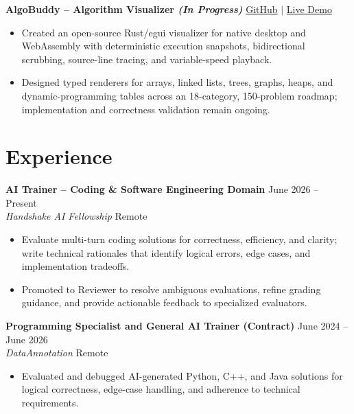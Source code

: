 \documentclass[10pt,letterpaper]{article}
\begin{document}
\vspace{3pt}
\textbf{AlgoBuddy -- Algorithm Visualizer \textit{(In Progress)}}
\hfill
\href{https://github.com/Rowrow620/AlgoBuddy}{GitHub}
$|$
\href{https://rowrow620.github.io/AlgoBuddy}{Live Demo}
\begin{itemize}
    \item Created an open-source Rust/egui visualizer for native desktop and WebAssembly with deterministic execution snapshots, bidirectional scrubbing, source-line tracing, and variable-speed playback.
    \item Designed typed renderers for arrays, linked lists, trees, graphs, heaps, and dynamic-programming tables across an 18-category, 150-problem roadmap; implementation and correctness validation remain ongoing.
\end{itemize}

\section*{Experience}

\textbf{AI Trainer -- Coding \& Software Engineering Domain}
\hfill June 2026 -- Present \\
\textit{Handshake AI Fellowship}
\hfill Remote
\begin{itemize}
    \item Evaluate multi-turn coding solutions for correctness, efficiency, and clarity; write technical rationales that identify logical errors, edge cases, and implementation tradeoffs.
    \item Promoted to Reviewer to resolve ambiguous evaluations, refine grading guidance, and provide actionable feedback to specialized evaluators.
\end{itemize}

\vspace{3pt}
\textbf{Programming Specialist and General AI Trainer (Contract)}
\hfill June 2024 -- June 2026 \\
\textit{DataAnnotation}
\hfill Remote
\begin{itemize}
    \item Evaluated and debugged AI-generated Python, C++, and Java solutions for logical correctness, edge-case handling, and adherence to technical requirements.
\end{itemize}
\end{document}
